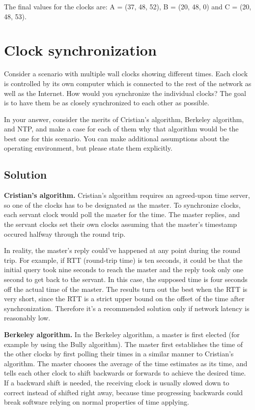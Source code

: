 \documentclass[12pt,a4paper,titlepage]{article}
\begin{document}
The final values for the clocks are: A = (37, 48, 52), B = (20, 48, 0) and C = (20, 48, 53).

\section{Clock synchronization}

Consider a scenario with multiple wall clocks showing different times. Each clock is controlled by its own computer which is connected to the rest of the network as well as the Internet. How would you synchronize the individual clocks? The goal is to have them be as closely synchronized to each other as possible.

In your answer, consider the merits of Cristian's algorithm, Berkeley algorithm, and NTP, and make a case for each of them why that algorithm would be the best one for this scenario. You can make additional assumptions about the operating environment, but please state them explicitly.

\subsection{Solution}

\textbf{Cristian's algorithm.} Cristian's algorithm requires an agreed-upon time server, so one of the clocks has to be designated as the master. To synchronize clocks, each servant clock would poll the master for the time. The master replies, and the servant clocks set their own clocks assuming that the master's timestamp occured halfway through the round trip.

In reality, the master's reply could've happened at any point during the round trip. For example, if RTT (round-trip time) is ten seconds, it could be that the initial query took nine seconds to reach the master and the reply took only one second to get back to the servant. In this case, the supposed time is four seconds off the actual time of the master. The results turn out the best when the RTT is very short, since the RTT is a strict upper bound on the offset of the time after synchronization. Therefore it's a recommended solution only if network latency is reasonably low.

\textbf{Berkeley algorithm.} In the Berkeley algorithm, a master is first elected (for example by using the Bully algorithm). The master first establishes the time of the other clocks by first polling their times in a similar manner to Cristian's algorithm. The master chooses the average of the time estimates as its time, and tells each other clock to shift backwards or forwards to achieve the desired time. If a backward shift is needed, the receiving clock is usually slowed down to correct instead of shifted right away, because time progressing backwards could break software relying on normal properties of time applying.
\end{document}
